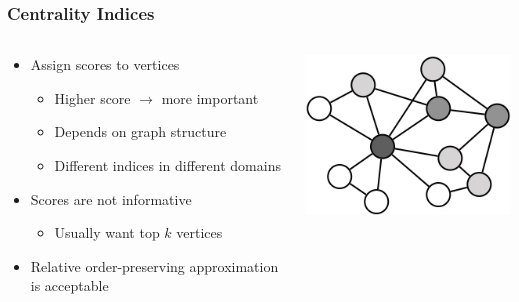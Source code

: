 \documentclass{beamer}
\begin{document}
\begin{frame}
\frametitle{Centrality Indices}


\begin{columns}
\begin{column}{0.6\textwidth}
	\begin{itemize}
		\item Assign scores to vertices
		\begin{itemize}
			\item Higher score $\rightarrow$ more important
			\item Depends on graph structure
			\item Different indices in different domains
		\end{itemize}
		\item Scores are not informative
		\begin{itemize}
			\item Usually want top $k$ vertices
		\end{itemize}
		\item Relative order-preserving approximation is acceptable
	\end{itemize}
\end{column}
\begin{column}{0.4\textwidth}  %
\begin{center}
	\includegraphics[width=1.0\textwidth]{centrality_greyscale}
\end{center}
\end{column}

\end{columns}
\end{frame}
\end{document}
